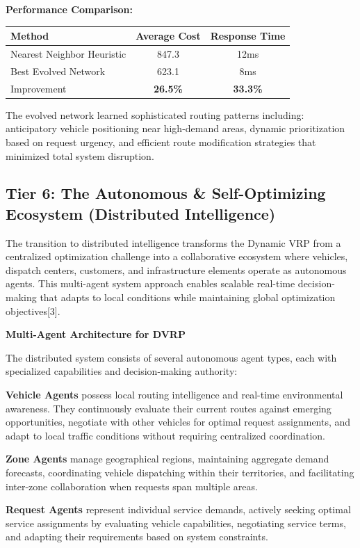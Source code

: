 \documentclass{article}
\begin{document}
\textbf{Performance Comparison:}
\begin{center}
\begin{tabular}{lcc}
\toprule
Method & Average Cost & Response Time \\
\midrule
Nearest Neighbor Heuristic & 847.3 & 12ms \\
Best Evolved Network & 623.1 & 8ms \\
Improvement & \textbf{26.5\%} & \textbf{33.3\%} \\
\bottomrule
\end{tabular}
\end{center}

The evolved network learned sophisticated routing patterns including: anticipatory vehicle positioning near high-demand areas, dynamic prioritization based on request urgency, and efficient route modification strategies that minimized total system disruption.

\subsection{Tier 6: The Autonomous \& Self-Optimizing Ecosystem (Distributed Intelligence)}

The transition to distributed intelligence transforms the Dynamic VRP from a centralized optimization challenge into a collaborative ecosystem where vehicles, dispatch centers, customers, and infrastructure elements operate as autonomous agents. This multi-agent system approach enables scalable real-time decision-making that adapts to local conditions while maintaining global optimization objectives[3].

\textbf{Multi-Agent Architecture for DVRP}

The distributed system consists of several autonomous agent types, each with specialized capabilities and decision-making authority:

\textbf{Vehicle Agents} possess local routing intelligence and real-time environmental awareness. They continuously evaluate their current routes against emerging opportunities, negotiate with other vehicles for optimal request assignments, and adapt to local traffic conditions without requiring centralized coordination.

\textbf{Zone Agents} manage geographical regions, maintaining aggregate demand forecasts, coordinating vehicle dispatching within their territories, and facilitating inter-zone collaboration when requests span multiple areas.

\textbf{Request Agents} represent individual service demands, actively seeking optimal service assignments by evaluating vehicle capabilities, negotiating service terms, and adapting their requirements based on system constraints.
\end{document}
